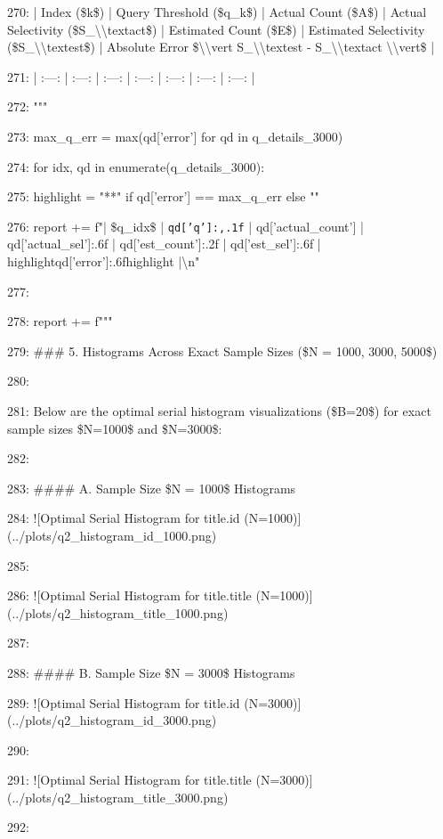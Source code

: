 \documentclass[11pt,a4paper]{article}
\begin{document}
270: | Index (\$k\$) | Query Threshold (\$q\_k\$) | Actual Count (\$A\$) | Actual Selectivity (\$S\_{{\textbackslash{}\textbackslash{}text{{act}}}}\$) | Estimated Count (\$E\$) | Estimated Selectivity (\$S\_{{\textbackslash{}\textbackslash{}text{{est}}}}\$) | Absolute Error \$\textbackslash{}\textbackslash{}vert S\_{{\textbackslash{}\textbackslash{}text{{est}}}} - S\_{{\textbackslash{}\textbackslash{}text{{act}}}} \textbackslash{}\textbackslash{}vert\$ |

271: | :---: | :---: | :---: | :---: | :---: | :---: | :---: |

272: """

273:     max\_q\_err = max(qd['error'] for qd in q\_details\_3000)

274:     for idx, qd in enumerate(q\_details\_3000):

275:         highlight = "**" if qd['error'] == max\_q\_err else ""

276:         report += f"| \$q\_{{{idx}}}\$ | \texttt{{qd['q']:,.1f}} | {qd['actual\_count']} | {qd['actual\_sel']:.6f} | {qd['est\_count']:.2f} | {qd['est\_sel']:.6f} | {highlight}{qd['error']:.6f}{highlight} |\textbackslash{}n"

277:

278:     report += f"""

279: \#\#\# 5. Histograms Across Exact Sample Sizes (\$N = 1000, 3000, 5000\$)

280:

281: Below are the optimal serial histogram visualizations (\$B=20\$) for exact sample sizes \$N=1000\$ and \$N=3000\$:

282:

283: \#\#\#\# A. Sample Size \$N = 1000\$ Histograms

284: ![Optimal Serial Histogram for title.id (N=1000)](../plots/q2\_histogram\_id\_1000.png)

285:

286: ![Optimal Serial Histogram for title.title (N=1000)](../plots/q2\_histogram\_title\_1000.png)

287:

288: \#\#\#\# B. Sample Size \$N = 3000\$ Histograms

289: ![Optimal Serial Histogram for title.id (N=3000)](../plots/q2\_histogram\_id\_3000.png)

290:

291: ![Optimal Serial Histogram for title.title (N=3000)](../plots/q2\_histogram\_title\_3000.png)

292:
\end{document}
